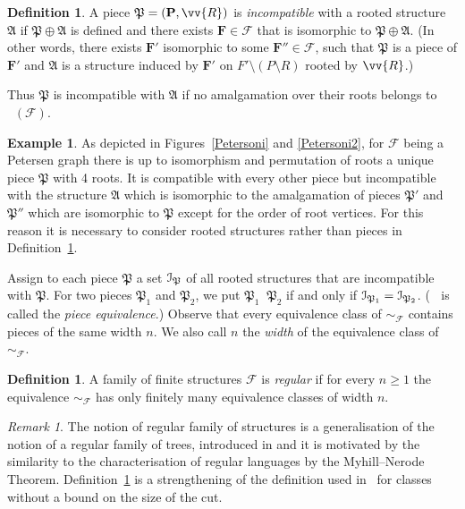 \documentclass{elsarticle}
\def\Forb{\mathop{\mathrm{Forb_{he}}}\nolimits}
\def\str#1{\mathbf {#1}}
\def\F{{\mathcal F}}
\def\Piece{{\mathfrak P}}
\def\APiece{{\mathfrak A}}
\def\Incompatible{{\cal I}}
\theoremstyle{plain}
\theoremstyle{definition}
\newtheorem{definition}[theorem]{Definition}
\newtheorem{example}[theorem]{Example}
\theoremstyle{remark}
\newtheorem*{remark}{Remark}
\begin{document}
\begin{definition}
\label{def:incompatible}
A piece $\Piece=(\str{P},\vv{R})$ is \emph{incompatible} with
a rooted structure $\APiece$ if $\Piece \oplus \APiece$ is defined and there exists $\str{F}\in \F$
that is isomorphic to $\Piece \oplus \APiece$.  
(In  other words, there exists $\str{F}'$ isomorphic to some $\str{F}''\in \F$, such that $\Piece$ is a piece of $\str{F}'$ and $\APiece$ is a structure induced by $\str{F'}$ on $F'\setminus (P\setminus R)$
 rooted by $\vv{R}$.) 
\end{definition}
Thus $\Piece$ is incompatible with $\APiece$ if no amalgamation over their roots belongs to $\Forb(\F)$.
\begin{example}
As depicted in Figures~\ref{Petersoni} and \ref{Petersoni2}, for $\mathcal F$ being a Petersen graph there is up to isomorphism and permutation of roots a unique
piece $\Piece$ with 4 roots.  It is compatible with every other piece but incompatible with the structure $\APiece$ which is isomorphic to
the amalgamation of pieces $\Piece'$ and $\Piece''$ which are isomorphic to $\Piece$ except for the order of root vertices.
For this reason it is necessary to consider rooted structures rather than pieces in Definition~\ref{def:incompatible}.
\end{example}

Assign to each piece $\Piece$ a set $\Incompatible_\Piece$ of all
rooted structures that are incompatible with $\Piece$.  For two pieces
$\Piece_1$ and $\Piece_2$, we put $\Piece_1 \mathop{\sim_\F} \Piece_2$ if and only if
$\Incompatible_{\Piece_1}=\Incompatible_{\Piece_2}$. ($\mathop{\sim_\F}$ is called the \emph{piece equivalence}.)
Observe that every equivalence class of $\sim_\F$ contains pieces of the same
width $n$. We also call $n$ the \emph{width} of the equivalence class of $\sim_\F$.

\begin{definition}
\label{def:regular}
A family of finite structures $\F$ is  \emph{regular} if for every $n\geq 1$ the equivalence $\sim_\F$ has only
finitely many equivalence classes of width $n$.
  \end{definition}
\begin{remark}
The notion of regular
family of structures is a generalisation of the notion of a regular family of trees, introduced in
\cite{Erdos2012} and it is motivated by the similarity
to the characterisation of regular languages by the Myhill--Nerode Theorem.
Definition~\ref{def:regular} is a strengthening of the definition used in~\cite{Hubicka2013}
for classes without a bound on the size of the cut.
\end{remark}
\end{document}
